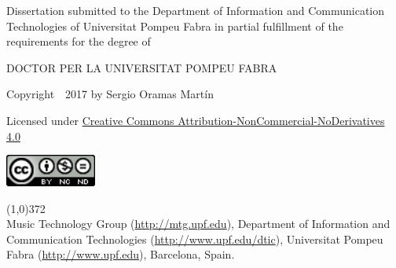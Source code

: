 \cleartorecto
\thispagestyle{empty}

\vspace*{02cm}

Dissertation submitted to the Department of Information and Communication Technologies of Universitat Pompeu Fabra in partial fulfillment of the requirements for the degree of

\vspace*{0.5cm}

\centerline{DOCTOR PER LA UNIVERSITAT POMPEU FABRA}


\vspace*{4cm}


{\centering

  Copyright~\textcopyright~2017 by Sergio Oramas Martín

  Licensed under \href{http://creativecommons.org/licenses/by-nc-nd/4.0/}{Creative Commons Attribution-NonCommercial-NoDerivatives 4.0}

  \vspace{0.5cm}

  \href{http://creativecommons.org/licenses/by-nc-nd/4.0/}
  {
    \centering
    \includegraphics[width=3cm]{ch00_pics/creative-commons.png}
    }

}

\vspace*{\fill}

\line(1,0){372}\\
\footnotesize
Music Technology Group (\url{http://mtg.upf.edu}), Department of Information and Communication Technologies (\url{http://www.upf.edu/dtic}), Universitat Pompeu Fabra (\url{http://www.upf.edu}), Barcelona, Spain.
\normalsize



